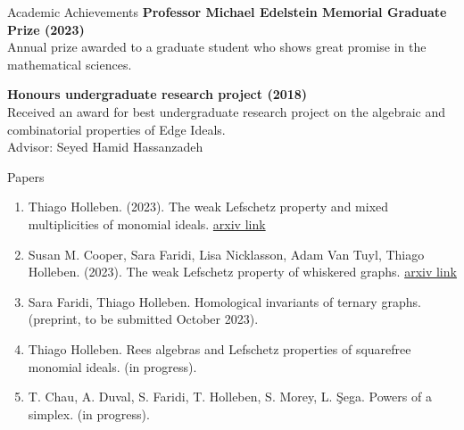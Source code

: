 \documentclass{resume} %
\begin{document}


\begin{rSection}{Academic Achievements}
{\bf Professor Michael Edelstein Memorial Graduate Prize (2023)}
\\
Annual prize awarded to a graduate student who shows great promise in the mathematical sciences. 


{\bf Honours undergraduate research project (2018)}
\\
Received an award for best undergraduate research project on the algebraic and combinatorial properties of Edge Ideals.
\\
Advisor: Seyed Hamid Hassanzadeh
\end{rSection}

\begin{rSection}{Papers}

\begin{enumerate}[label={}]
    \item Thiago Holleben. (2023). The weak Lefschetz property and mixed multiplicities of monomial ideals.  \href{https://arxiv.org/abs/2306.13274}{arxiv link}
    \item Susan M. Cooper, Sara Faridi, Lisa Nicklasson, Adam Van Tuyl, Thiago Holleben. (2023). The weak Lefschetz property of whiskered graphs. \href{https://arxiv.org/abs/2306.04393}{arxiv link}
    \item Sara Faridi, Thiago Holleben. Homological invariants of ternary graphs. (preprint, to be submitted October 2023).
    \item Thiago Holleben. Rees algebras and Lefschetz properties of squarefree monomial ideals. (in progress).
    \item T. Chau, A. Duval, S. Faridi, T. Holleben, S. Morey, L. \c{S}ega.  Powers of a simplex. (in progress).
\end{enumerate}
\end{rSection}
\end{document}
